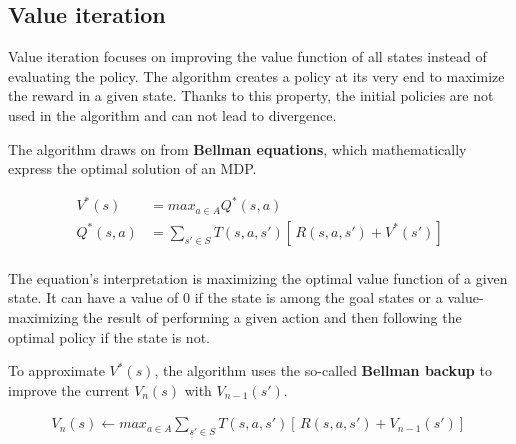 \subsection{Value iteration} \label{VI}
Value iteration focuses on improving the value function of all states instead of evaluating the policy. The algorithm creates a policy at its very end to maximize the reward in a given state. Thanks to this property, the initial policies are not used in the algorithm and can not lead to divergence.

The algorithm draws on from \textbf{Bellman equations}, which mathematically express the optimal solution of an MDP.

\begin{equation}
\begin{aligned}
V^* (s) & = max_{a \in A} Q^* (s, a) \\ 
Q^* (s, a) & = \sum_{s' \in S} T(s, a, s')[ \,R(s, a, s') + V^*(s')]  \\
\end{aligned}
\end{equation}


The equation's interpretation is maximizing the optimal value function of a given state. It can have a value of 0 if the state is among the goal states or a value-maximizing the result of performing a given action and then following the optimal policy if the state is not.

To approximate $V^* (s)$, the algorithm uses the so-called \textbf{Bellman backup} to improve the current $V_n (s)$ with $V_{n-1} (s')$.


\begin{equation}
\begin{aligned}
V_n (s) \xleftarrow{} max_{a \in A} \sum_{s' \in S} T(s, a, s') [ \,R(s, a, s') + V_{n - 1} (s')] \,
\end{aligned}
\end{equation}


